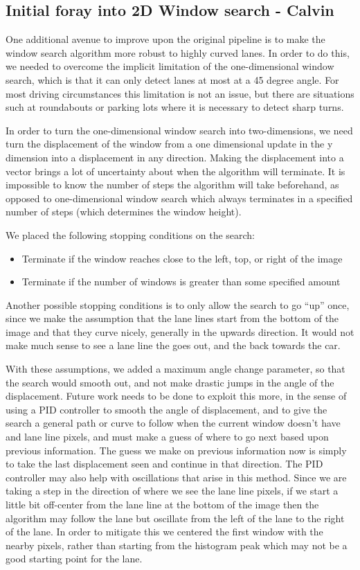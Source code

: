 \documentclass[twoside,twocolumn]{article}
\begin{document}
\subsection{Initial foray into 2D Window search - Calvin}
\par One additional avenue to improve upon the original pipeline is to make the window search algorithm more robust to highly curved lanes. In order to do this, we needed to overcome the implicit limitation of the one-dimensional window search, which is that it can only detect lanes at most at a 45 degree angle. For most driving circumstances this limitation is not an issue, but there are situations such at roundabouts or parking lots where it is necessary to detect sharp turns.
\par In order to turn the one-dimensional window search into two-dimensions, we need turn the displacement of the window from a one dimensional update in the y dimension into a displacement in any direction. Making the displacement into a vector brings a lot of uncertainty about when the algorithm will terminate. It is impossible to know the number of steps the algorithm will take beforehand, as opposed to one-dimensional window search which always terminates in a specified number of steps (which determines the window height).
\par We placed the following stopping conditions on the search:
\begin{itemize}
\item Terminate if the window reaches close to the left, top, or right of the image
\item Terminate if the number of windows is greater than some specified amount
\end{itemize}
Another possible stopping conditions is to only allow the search to go “up” once, since we make the assumption that the lane lines start from the bottom of the image and that they curve nicely, generally in the upwards direction. It would not make much sense to see a lane line the goes out, and the back towards the car.
\par With these assumptions, we added a maximum angle change parameter, so that the search would smooth out, and not make drastic jumps in the angle of the displacement. Future work needs to be done to exploit this more, in the sense of using a PID controller to smooth the angle of displacement, and to give the search a general path or curve to follow when the current window doesn't have and lane line pixels, and must make a guess of where to go next based upon previous information. The guess we make on previous information now is simply to take the last displacement seen and continue in that direction. The PID controller may also help with oscillations that arise in this method. Since we are taking a step in the direction of where we see the lane line pixels, if we start a little bit off-center from the lane line at the bottom of the image then the algorithm may follow the lane but oscillate from the left of the lane to the right of the lane. In order to mitigate this we centered the first window with the nearby pixels, rather than starting from the histogram peak which may not be a good starting point for the lane.
\end{document}
